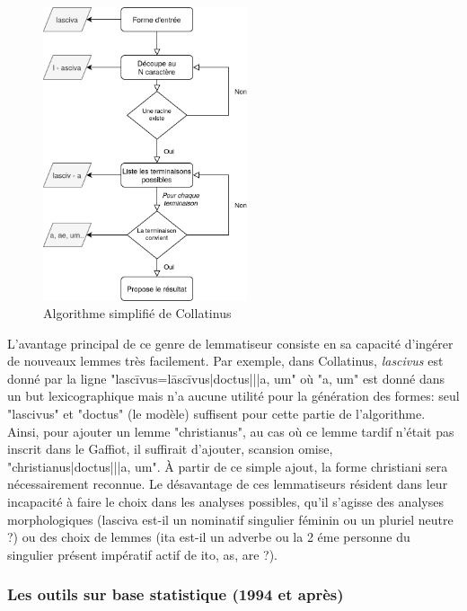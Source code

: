 \begin{figure}[h]
    \centering
    \includegraphics[width=6cm]{results/lemmatisation/outils/collatinus.png}
    \caption{Algorithme simplifié de Collatinus}
    \label{lemmatisation:outils:collatinusAlgorythme}
\end{figure}

L'avantage principal de ce genre de lemmatiseur consiste en sa capacité d'ingérer de nouveaux lemmes très facilement. Par exemple, dans Collatinus, \textit{lascivus} est donné par la ligne "lascīvus=lāscīvus|doctus|||a, um" où "a, um" est donné dans un but lexicographique mais n'a aucune utilité pour la génération des formes: seul "lascivus" et "doctus" (le modèle) suffisent pour cette partie de l'algorithme. Ainsi, pour ajouter un lemme "christianus", au cas où ce lemme tardif n'était pas inscrit dans le Gaffiot, il suffirait d'ajouter, scansion omise, "christianus|doctus|||a, um". À partir de ce simple ajout, la forme christiani sera nécessairement reconnue. Le désavantage de ces lemmatiseurs résident dans leur incapacité à faire le choix dans les analyses possibles, qu'il s'agisse des analyses morphologiques (lasciva est-il un nominatif singulier féminin ou un pluriel neutre ?) ou des choix de lemmes (ita est-il un adverbe ou la 2 éme personne du singulier présent impératif actif de ito, as, are ?).

\subsubsection{Les outils sur base statistique (1994 et après)}

